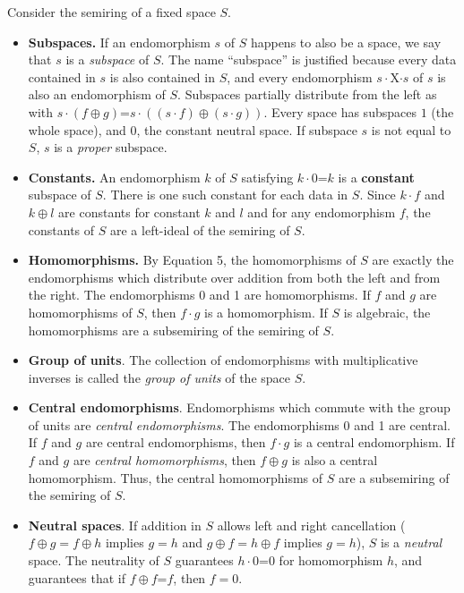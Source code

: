\documentclass[11pt]{article}
\begin{document}
Consider the semiring of a fixed space $S$.  
\begin{itemize}

\item{{\bf Subspaces.} If an endomorphism $s$ of $S$ happens to also be a space, we say that $s$ is a {\it subspace} of $S$.  The name ``subspace'' is justified because every data contained in $s$ is also contained in $S$, and every endomorphism $s\cdot$X$\cdot s$ of $s$ is also an endomorphism of $S$.  
Subspaces partially distribute from the left as with $s\cdot(f\oplus g)$=$s\cdot((s\cdot f)\oplus(s\cdot g))$.
Every space has subspaces $1$ (the whole space), and $0$, the constant neutral space.  If subspace $s$ is not equal to $S$, $s$ is a {\it proper} subspace.} 

\item{{\bf Constants.}  An endomorphism $k$ of $S$ satisfying $k\cdot 0$=$k$ is a {\bf constant} subspace of $S$.  There is one such constant for each 
data in $S$.  Since $k\cdot f$ and $k\oplus l$ are constants for 
constant $k$ and $l$ and for any endomorphism $f$, the constants of $S$ are a left-ideal of the semiring of $S$.} 

\item{{\bf Homomorphisms.}  By Equation 5, the homomorphisms of $S$ are exactly the endomorphisms which distribute over addition from
both the left and from the right.  The endomorphisms 0 and 1 are homomorphisms.  If $f$ and $g$ are homomorphisms of $S$, then 
$f\cdot g$ is a homomorphism.  If $S$ is algebraic, the homomorphisms are a subsemiring of the semiring of $S$.} 

\item {{\bf Group of units}. The collection of endomorphisms with multiplicative inverses is called the {\it group of units} of the space $S$.} 

\item{{\bf Central endomorphisms}.  Endomorphisms which commute with the group of units are {\it central endomorphisms}.  The endomorphisms 0 and 1 
are central.  If $f$ and $g$ are central endomorphisms, then $f\cdot g$ is a central endomorphism.  If $f$ and $g$ are {\it central homomorphisms}, then 
$f\oplus g$ is also a central homomorphism.  Thus, the central homomorphisms of $S$ are a subsemiring of the semiring of $S$.}

\item{{\bf Neutral spaces}. If addition in $S$ allows left and right cancellation ($f\oplus g=f\oplus h$ implies $g=h$ and $g\oplus f=h\oplus f$ implies $g=h$), 
$S$ is a {\it neutral} space.  The neutrality of $S$ guarantees $h\cdot 0$=0 for homomorphism $h$, and guarantees that if $f\oplus f$=$f$, then $f=0$.} 


\end{itemize}
\end{document}
